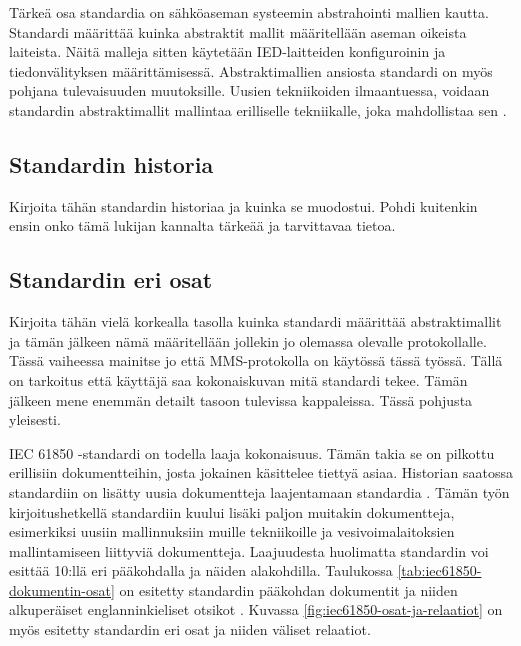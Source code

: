 Tärkeä osa standardia on sähköaseman systeemin abstrahointi mallien kautta. Standardi määrittää kuinka abstraktit mallit määritellään aseman oikeista laiteista. Näitä malleja sitten käytetään IED-laitteiden konfiguroinin ja tiedonvälityksen määrittämisessä. Abstraktimallien ansiosta standardi on myös pohjana tulevaisuuden muutoksille. Uusien tekniikoiden ilmaantuessa, voidaan standardin abstraktimallit mallintaa erilliselle tekniikalle, joka mahdollistaa sen \cite[s.~2]{Brunner2008}.

\subsection{Standardin historia}
\begin{it}
	Kirjoita tähän standardin historiaa ja kuinka se muodostui. Pohdi kuitenkin ensin onko tämä lukijan kannalta tärkeää ja tarvittavaa tietoa.
\end{it}

\subsection{Standardin eri osat}

\begin{it}
	Kirjoita tähän vielä korkealla tasolla kuinka standardi määrittää abstraktimallit ja tämän jälkeen nämä määritellään jollekin jo olemassa olevalle protokollalle. Tässä vaiheessa mainitse jo että MMS-protokolla on käytössä tässä työssä. Tällä on tarkoitus että käyttäjä saa kokonaiskuvan mitä standardi tekee. Tämän jälkeen mene enemmän detailt tasoon tulevissa kappaleissa. Tässä pohjusta yleisesti.
\end{it}

IEC 61850 -standardi on todella laaja kokonaisuus. Tämän takia se on pilkottu erillisiin dokumentteihin, josta jokainen käsittelee tiettyä asiaa. Historian saatossa standardiin on lisätty uusia dokumentteja laajentamaan standardia \cite{IEC61850series, New-documents-by-IEC-TC-57}. Tämän työn kirjoitushetkellä standardiin kuului lisäki paljon muitakin dokumentteja, esimerkiksi uusiin mallinnuksiin muille tekniikoille ja vesivoimalaitoksien mallintamiseen liittyviä dokumentteja. Laajuudesta huolimatta standardin voi esittää 10:llä eri pääkohdalla ja näiden alakohdilla. Taulukossa \ref{tab:iec61850-dokumentin-osat} on esitetty standardin pääkohdan dokumentit ja niiden alkuperäiset englanninkieliset otsikot \cite[s.~2]{Mackiewicz2006} \cite{IEC61850series}. Kuvassa \ref{fig:iec61850-osat-ja-relaatiot} on myös esitetty standardin eri osat ja niiden väliset relaatiot.

